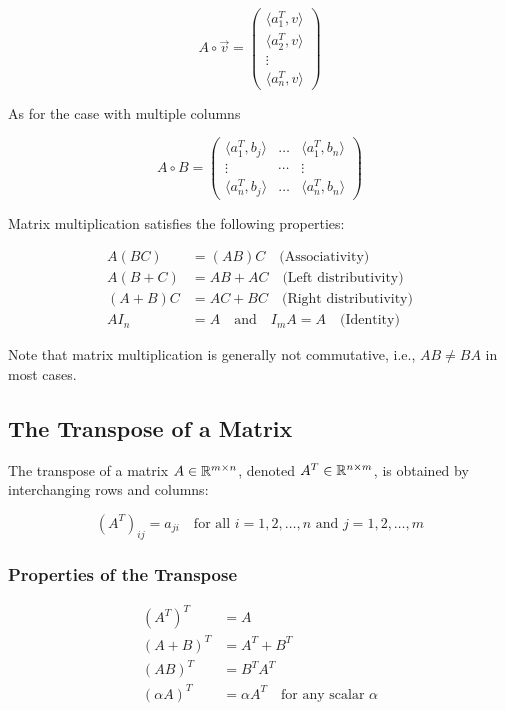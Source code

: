 \[
    A \circ \vec{v} = 
    \begin{pmatrix}
    \langle a_{1}^T, v\rangle \\
    \langle a_{2}^T, v\rangle \\
    \vdots \\
    \langle a_{n}^T, v\rangle 
    \end{pmatrix}
\]

As for the case with multiple columns

\[
    A \circ B = 
    \begin{pmatrix}
    \langle a_{1}^T, b_{j} \rangle & \dots  & \langle a_{1}^T, b_{n} \rangle \\
    \vdots                         & \cdots &              \vdots            \\
    \langle a_{n}^T, b_{j} \rangle & \dots  & \langle a_{n}^T, b_{n} \rangle 
    \end{pmatrix}
\]

Matrix multiplication satisfies the following properties:

\begin{align*}
    A(BC) &= (AB)C \quad \text{(Associativity)} \\
    A(B+C) &= AB + AC \quad \text{(Left distributivity)} \\
    (A+B)C &= AC + BC \quad \text{(Right distributivity)} \\
    AI_n &= A \quad \text{and} \quad I_m A = A \quad \text{(Identity)}
\end{align*}

Note that matrix multiplication is generally not commutative, i.e., \(AB \neq BA\) in most cases.

\subsection{The Transpose of a Matrix}

The transpose of a matrix \(A \in \mathbb{R}^{m \times n}\), denoted \(A^T \in \mathbb{R}^{n \times m}\), is obtained by interchanging rows and columns:

\[
    {(A^T)}_{ij} = a_{ji} \quad \text{for all } i = 1, 2, \ldots, n \text{ and } j = 1, 2, \ldots, m
\]

\subsubsection{Properties of the Transpose}

\begin{align*}
    {(A^T)}^T &= A \\
    {(A + B)}^T &= A^T + B^T \\
    {(AB)}^T &= B^T A^T \\
    {(\alpha A)}^T &= \alpha A^T \quad \text{for any scalar } \alpha
\end{align*}


